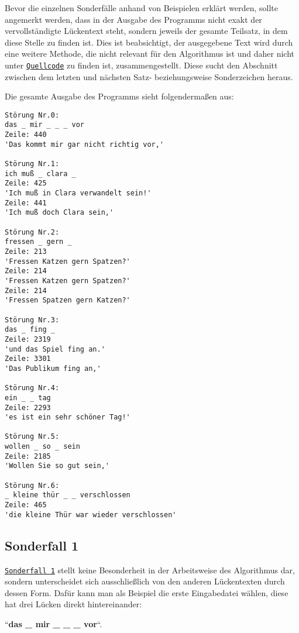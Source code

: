 \documentclass[a4paper, 10pt, ngerman]{scrartcl}
\begin{document}
Bevor die einzelnen Sonderfälle anhand von Beispielen erklärt werden,
sollte angemerkt werden,
dass in der Ausgabe des Programms nicht exakt der vervollständigte Lückentext steht,
sondern jeweils der gesamte Teilsatz,
in dem diese Stelle zu finden ist.
Dies ist beabsichtigt,
der ausgegebene Text wird durch eine weitere Methode,
die nicht relevant für den Algorithmus ist
und daher nicht unter \hyperref[sec:quellcode]{\texttt{Quellcode}} zu finden ist,
zusammengestellt.
Diese sucht den Abschnitt zwischen dem letzten und nächsten Satz- beziehungsweise Sonderzeichen heraus.

\clearpage

Die gesamte Ausgabe des Programms sieht folgendermaßen aus:

\begin{lstlisting}[title=Ausgabe des Programms, breaklines=true, label=lst:ausgabe]
Störung Nr.0:
das _ mir _ _ _ vor 
Zeile: 440
'Das kommt mir gar nicht richtig vor,'

Störung Nr.1:
ich muß _ clara _ 
Zeile: 425
'Ich muß in Clara verwandelt sein!'
Zeile: 441
'Ich muß doch Clara sein,'

Störung Nr.2:
fressen _ gern _ 
Zeile: 213
'Fressen Katzen gern Spatzen?'
Zeile: 214
'Fressen Katzen gern Spatzen?'
Zeile: 214
'Fressen Spatzen gern Katzen?'

Störung Nr.3:
das _ fing _ 
Zeile: 2319
'und das Spiel fing an.'
Zeile: 3301
'Das Publikum fing an,'

Störung Nr.4:
ein _ _ tag 
Zeile: 2293
'es ist ein sehr schöner Tag!'

Störung Nr.5:
wollen _ so _ sein 
Zeile: 2185
'Wollen Sie so gut sein,'

Störung Nr.6:
_ kleine thür _ _ verschlossen 
Zeile: 465
'die kleine Thür war wieder verschlossen'
\end{lstlisting}

\clearpage

\subsection{Sonderfall 1}\label{sec:ersterSonderfall}
\hyperref[sonderfallEins]{\texttt{Sonderfall 1}} stellt keine Besonderheit in der Arbeitsweise des Algorithmus dar,
sondern unterscheidet sich ausschließlich von den anderen Lückentexten durch dessen Form.
Dafür kann man als Beispiel die erste Eingabedatei wählen,
diese hat drei Lücken direkt hintereinander:

``\textbf{das \_ mir \_ \_ \_ vor}``.
\end{document}
